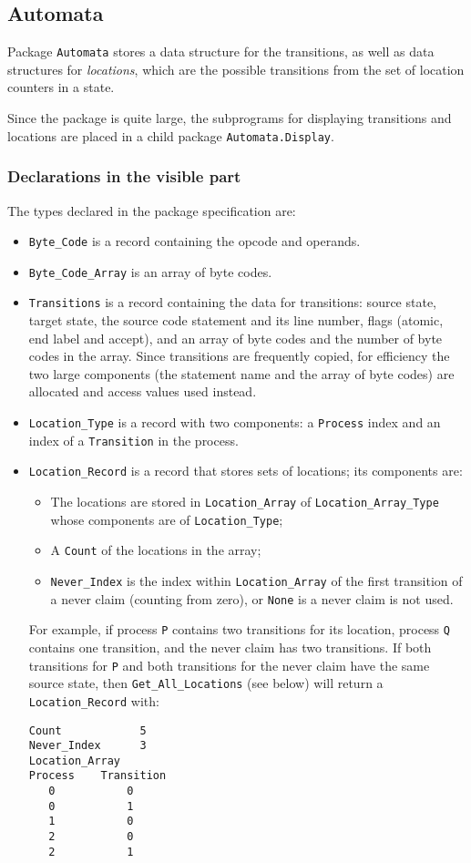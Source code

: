 \documentclass[11pt]{article}
\newcommand*{\p}[1]{\texttt{#1}}
\begin{document}
\subsection{Automata}

Package \p{Automata} stores a data structure for the transitions, as
well as data structures for \emph{locations}, which are the possible
transitions from the set of location counters in a state.

Since the package is quite large, the subprograms for displaying
transitions and locations are placed in a child package
\p{Automata.Display}.

\subsubsection*{Declarations in the visible part}

The types declared in the package specification are:
\begin{itemize}
\item \p{Byte\_Code} is a record containing the opcode and operands.
\item \p{Byte\_Code\_Array} is an array of byte codes.
\item \p{Transitions} is a record containing the data for transitions:
source state, target state, the source code statement and its line
number, flags (atomic, end label and accept), and an array of byte codes
and the number of byte codes in the array.
Since transitions are frequently copied, for efficiency the two large
components (the statement name and the array of byte codes) are
allocated and access values used instead.
\item \p{Location\_Type} is a record with two components: a \p{Process}
index and an index of a \p{Transition} in the process.
\item \p{Location\_Record} is a record that stores sets of locations;
its components are:
\begin{itemize}
\item The locations are stored in \p{Location\_Array} of
\p{Location\_Array\_Type} whose components are of \p{Location\_Type};
\item A \p{Count} of the locations in the array;
\item \p{Never\_Index} is the index within \p{Location\_Array} of the
first transition of a never claim (counting from zero), or \p{None} is a
never claim is not used.
\end{itemize}
For example, if process \p{P} contains two transitions for its location,
process \p{Q} contains one transition, and the never claim has two
transitions. If both transitions for \p{P} and both transitions
for the never claim have the same source state, then
\p{Get\_All\_Locations} (see below) will return a \p{Location\_Record}
with:
\begin{verbatim}
Count            5
Never_Index      3
Location_Array
Process    Transition
   0           0
   0           1
   1           0
   2           0
   2           1
\end{verbatim}
\end{itemize}
\end{document}
